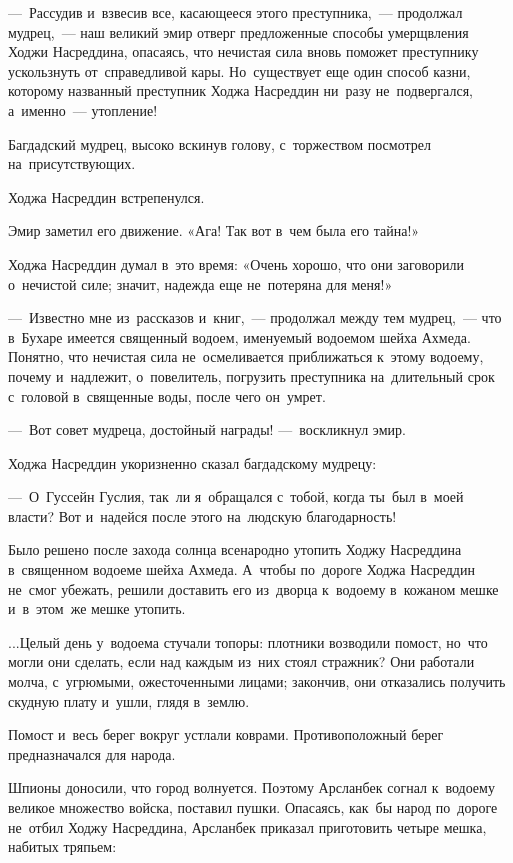 \documentclass[12pt,a4paper]{book}
\begin{document}
—~Рассудив и~взвесив все, касающееся этого преступника,~— продолжал мудрец,~— наш великий эмир отверг предложенные способы умерщвления Ходжи Насреддина, опасаясь, что нечистая сила вновь поможет преступнику ускользнуть от~справедливой кары. Но~существует еще один способ казни, которому названный преступник Ходжа Насреддин ни~разу не~подвергался, а~именно~— утопление!

Багдадский мудрец, высоко вскинув голову, с~торжеством посмотрел на~присутствующих.

Ходжа Насреддин встрепенулся.

Эмир заметил его движение. «Ага! Так вот в~чем была его тайна!»

Ходжа Насреддин думал в~это время: «Очень хорошо, что они заговорили о~нечистой силе; значит, надежда еще не~потеряна для меня!»

—~Известно мне из~рассказов и~книг,~— продолжал между тем мудрец,~— что в~Бухаре имеется священный водоем, именуемый водоемом шейха Ахмеда. Понятно, что нечистая сила не~осмеливается приближаться к~этому водоему, почему и~надлежит, о~повелитель, погрузить преступника на~длительный срок с~головой в~священные воды, после чего он~умрет.

—~Вот совет мудреца, достойный награды! —~воскликнул эмир.

Ходжа Насреддин укоризненно сказал багдадскому мудрецу:

—~О~Гуссейн Гуслия, так~ли я~обращался с~тобой, когда ты~был в~моей власти? Вот и~надейся после этого на~людскую благодарность!

Было решено после захода солнца всенародно утопить Ходжу Насреддина в~священном водоеме шейха Ахмеда. А~чтобы по~дороге Ходжа Насреддин не~смог убежать, решили доставить его из~дворца к~водоему в~кожаном мешке и~в~этом~же мешке утопить.

...Целый день у~водоема стучали топоры: плотники возводили помост, но~что могли они сделать, если над каждым из~них стоял стражник? Они работали молча, с~угрюмыми, ожесточенными лицами; закончив, они отказались получить скудную плату и~ушли, глядя в~землю.

Помост и~весь берег вокруг устлали коврами. Противоположный берег предназначался для народа.

Шпионы доносили, что город волнуется. Поэтому Арсланбек согнал к~водоему великое множество войска, поставил пушки. Опасаясь, как~бы народ по~дороге не~отбил Ходжу Насреддина, Арсланбек приказал приготовить четыре мешка, набитых тряпьем:
\end{document}
